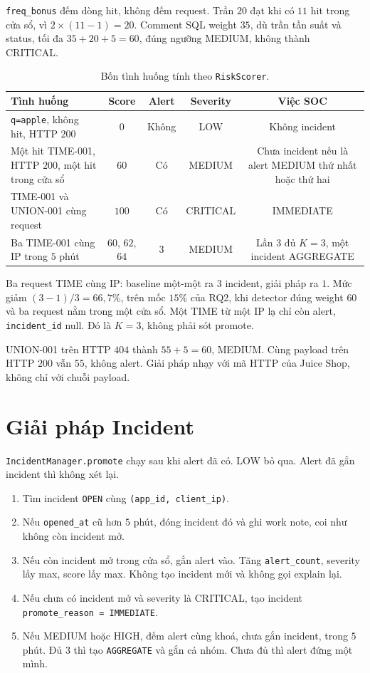 \documentclass[a4paper,11pt]{article}
\begin{document}
\texttt{freq\_bonus} đếm dòng hit, không đếm request. Trần $20$ đạt khi có $11$ hit trong cửa sổ, vì $2\times(11-1)=20$. Comment SQL weight $35$, dù trần tần suất và status, tối đa $35+20+5=60$, đúng ngưỡng MEDIUM, không thành CRITICAL.

\begin{table}[ht]
\centering
\caption{Bốn tình huống tính theo \texttt{RiskScorer}.}
\label{tab:examples}
\small
\begin{tabularx}{\linewidth}{@{}Ycccc@{}}
\toprule
Tình huống & Score & Alert & Severity & Việc SOC \\
\midrule
\texttt{q=apple}, không hit, HTTP $200$ & $0$ & Không & LOW & Không incident \\
Một hit TIME-001, HTTP $200$, một hit trong cửa sổ & $60$ & Có & MEDIUM & Chưa incident nếu là alert MEDIUM thứ nhất hoặc thứ hai \\
TIME-001 và UNION-001 cùng request & $100$ & Có & CRITICAL & IMMEDIATE \\
Ba TIME-001 cùng IP trong $5$ phút & $60$, $62$, $64$ & $3$ & MEDIUM & Lần $3$ đủ $K{=}3$, một incident AGGREGATE \\
\bottomrule
\end{tabularx}
\end{table}

Ba request TIME cùng IP: baseline một-một ra $3$ incident, giải pháp ra $1$. Mức giảm $(3-1)/3 = 66{,}7\%$, trên mốc $15\%$ của RQ2, khi detector đúng weight $60$ và ba request nằm trong một cửa sổ. Một TIME từ một IP lạ chỉ còn alert, \texttt{incident\_id} null. Đó là $K{=}3$, không phải sót promote.

UNION-001 trên HTTP $404$ thành $55+5=60$, MEDIUM. Cùng payload trên HTTP $200$ vẫn $55$, không alert. Giải pháp nhạy với mã HTTP của Juice Shop, không chỉ với chuỗi payload.

\section{Giải pháp Incident}

\texttt{IncidentManager.promote} chạy sau khi alert đã có. LOW bỏ qua. Alert đã gắn incident thì không xét lại.

\begin{enumerate}
\item Tìm incident \texttt{OPEN} cùng \texttt{(app\_id, client\_ip)}.
\item Nếu \texttt{opened\_at} cũ hơn $5$ phút, đóng incident đó và ghi work note, coi như không còn incident mở.
\item Nếu còn incident mở trong cửa sổ, gắn alert vào. Tăng \texttt{alert\_count}, severity lấy max, score lấy max. Không tạo incident mới và không gọi explain lại.
\item Nếu chưa có incident mở và severity là CRITICAL, tạo incident \texttt{promote\_reason = IMMEDIATE}.
\item Nếu MEDIUM hoặc HIGH, đếm alert cùng khoá, chưa gắn incident, trong $5$ phút. Đủ $3$ thì tạo \texttt{AGGREGATE} và gắn cả nhóm. Chưa đủ thì alert đứng một mình.
\end{enumerate}
\end{document}
